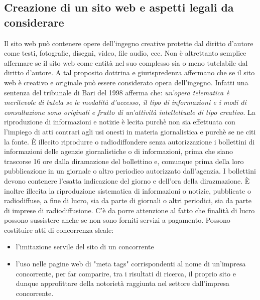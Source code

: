 \subsection{Creazione di un sito web e aspetti legali da considerare}
Il sito web può contenere opere dell'ingegno creative protette dal diritto d'autore come testi, fotografie,
disegni, video, file audio, ecc. \newline
Non è altrettanto semplice affermare se il sito web come entità nel suo complesso sia o meno tutelabile dal
diritto d'autore. A tal proposito dottrina e giurispredenza affermano che se il sito web è creativo e originale
può essere considerato opera dell'ingegno. Infatti una sentenza del tribunale di Bari del 1998 afferma che: \newline
\emph{un'opera telematica è meritevole di tutela se le modalità d'accesso, il tipo di informazioni e i modi di consultazione
sono originali e frutto di un'attività intellettuale di tipo creativo}.\newline
La riproduzione di informazioni e notizie è lecita purchè non sia effettuata con l'impiego di atti contrari
agli usi onesti in materia giornalistica e purchè se ne citi la fonte. \newline
È illecito riprodurre o radiodiffondere senza autorizzazione i bollettini di informazioni delle agenzie giornalistiche o di informazioni, prima che
siano trascorse 16 ore dalla diramazione del bollettino e, comunque prima della loro pubblicazione in un giornale
o altro periodico autorizzato dall'agenzia. I bollettini devono contenere l'esatta indicazione del giorno e dell'ora della
dirazmazione. \newline
È inoltre illecita la riproduzione sistematica di informazioni o notizie, pubblicate o radiodiffuse, a fine di lucro,
sia da parte di giornali o altri periodici, sia da parte di imprese di radiodiffusione. C'è da porre attenzione al fatto
che finalità di lucro possono sussistere anche se non sono forniti servizi a pagamento.\newline
\newline
Possono costituire atti di concorrenza sleale:
\begin{itemize}
    \item l'imitazione servile del sito di un concorrente
    \item l'uso nelle pagine web di "meta tags" corrispondenti al nome di un'impresa concorrente,
    per far comparire, tra i risultati di ricerca, il proprio sito e dunque approfittare della notorietà
    raggiunta nel settore dall'impresa concorrente.
\end{itemize}

